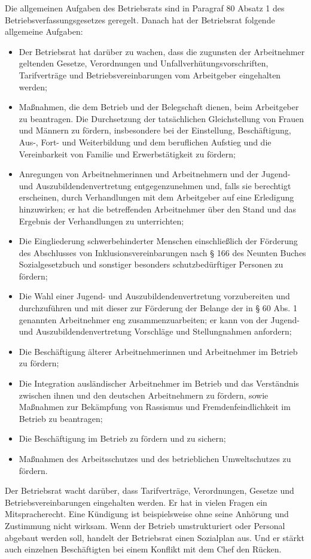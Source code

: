Die allgemeinen Aufgaben des Betriebsrats sind in Paragraf 80 Absatz 1 des Betriebsverfassungsgesetzes geregelt. Danach hat der Betriebsrat folgende allgemeine Aufgaben:
\begin{itemize}
	\item 
	Der Betriebsrat hat darüber zu wachen, dass die zugunsten der Arbeitnehmer geltenden Gesetze, Verordnungen und Unfallverhütungsvorschriften, Tarifverträge und Betriebsvereinbarungen vom Arbeitgeber eingehalten werden;
	\item
	Maßnahmen, die dem Betrieb und der Belegschaft dienen, beim Arbeitgeber zu beantragen. Die Durchsetzung der tatsächlichen Gleichstellung von Frauen und Männern zu fördern, insbesondere bei der Einstellung, Beschäftigung, Aus-, Fort- und Weiterbildung und dem beruflichen Aufstieg und die Vereinbarkeit von Familie und Erwerbstätigkeit zu fördern;
	\item 
	Anregungen von Arbeitnehmerinnen und Arbeitnehmern und der Jugend- und Auszubildendenvertretung entgegenzunehmen und, falls sie berechtigt erscheinen, durch Verhandlungen mit dem Arbeitgeber auf eine Erledigung hinzuwirken; er hat die betreffenden Arbeitnehmer über den Stand und das Ergebnis der Verhandlungen zu unterrichten;
	\item
	Die Eingliederung schwerbehinderter Menschen einschließlich der Förderung des Abschlusses von Inklusionsvereinbarungen nach § 166 des Neunten Buches Sozialgesetzbuch und sonstiger besonders schutzbedürftiger Personen zu fördern;
	\item
	Die Wahl einer Jugend- und Auszubildendenvertretung vorzubereiten und durchzuführen und mit dieser zur Förderung der Belange der in § 60 Abs. 1 genannten Arbeitnehmer eng zusammenzuarbeiten; er kann von der Jugend- und Auszubildendenvertretung Vorschläge und Stellungnahmen anfordern;
	\item
	Die Beschäftigung älterer Arbeitnehmerinnen und Arbeitnehmer im Betrieb zu fördern;
	\item
	Die Integration ausländischer Arbeitnehmer im Betrieb und das Verständnis zwischen ihnen und den deutschen Arbeitnehmern zu fördern, sowie Maßnahmen zur Bekämpfung von Rassismus und Fremdenfeindlichkeit im Betrieb zu beantragen;
	\item
	Die Beschäftigung im Betrieb zu fördern und zu sichern;
	\item
	Maßnahmen des Arbeitsschutzes und des betrieblichen Umweltschutzes zu fördern.
\end{itemize}

\newline
Der Betriebsrat wacht darüber, dass Tarifverträge, Verordnungen, Gesetze und Betriebsvereinbarungen eingehalten werden. Er hat in vielen Fragen ein Mitspracherecht. Eine Kündigung ist beispielsweise ohne seine Anhörung und Zustimmung nicht wirksam. Wenn der Betrieb umstrukturiert oder Personal abgebaut werden soll, handelt der Betriebsrat einen Sozialplan aus. Und er stärkt auch einzelnen Beschäftigten bei einem Konflikt mit dem Chef den Rücken.
\newline

